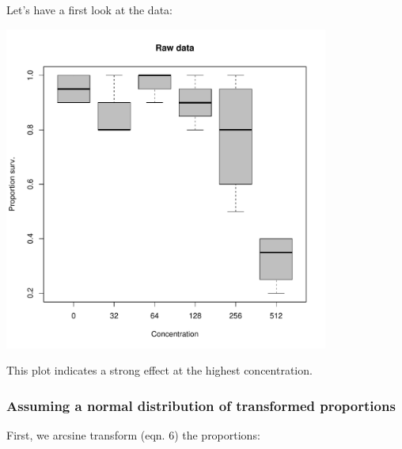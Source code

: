 Let's have a first look at the data:
\begin{knitrout}
\color{fgcolor}\small\begin{kframe}
\begin{alltt}
 \hlopt{~}   
             \hlstd{=} \hlstd{,}  \hlstd{=} \hlstd{,}
             \hlstd{=} \hlstd{,}  \hlstd{=} \hlstd{)}
\end{alltt}
\end{kframe}

{\centering \includegraphics[width=0.8\textwidth]{appendix/usetheglm/two/bin_raw_plot-1} 

}



\end{knitrout}
This plot indicates a strong effect at the highest concentration.


\subsubsection{Assuming a normal distribution of transformed proportions}
First, we arcsine transform (eqn. 6) the proportions:
\begin{knitrout}
\color{fgcolor}\small\begin{kframe}
\begin{alltt}
\hlopt{$} \hlkwb{<-} \hlopt{$} \hlopt{==} \hlstd{,}
                     \hlstd{(}\hlstd{)} \hlopt{-} \hlstd{(}\hlstd{(}\hlopt{/}\hlstd{)),}
                     \hlopt{$} \hlopt{==} \hlstd{,}
                            \hlstd{(}\hlstd{(}\hlopt{/}\hlstd{)),}
                            \hlstd{(}\hlopt{$}
                            \hlstd{)}
                     \hlstd{)}
\end{alltt}
\end{kframe}
\end{knitrout}

